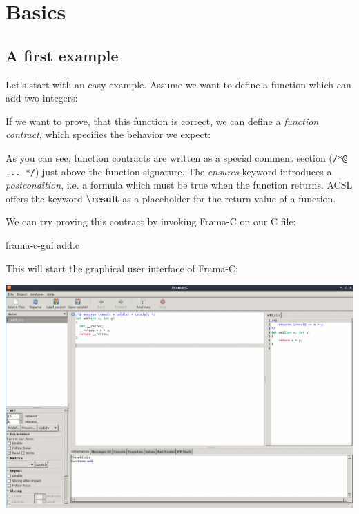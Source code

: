 \chapter{Basics}

\section{A first example}

Let's start with an easy example. Assume we want to define a function which can add two integers:


If we want to prove, that this function is correct, we can define a \emph{function contract}, which specifies the behavior we expect:


As you can see, function contracts are written as a special comment section  (\texttt{/*@ ... */}) just above the function signature. The \emph{ensures} keyword introduces a \emph{postcondition}, i.e. a formula which must be true when the function returns. ACSL offers the keyword \textbf{\textbackslash result} as a placeholder for the return value of a function. 

We can try proving this contract by invoking Frama-C on our C file:

\begin{ubuntu}
frama-c-gui add.c
\end{ubuntu}

This will start the graphical user interface of Frama-C:

\begin{center}
\includegraphics[width=\textwidth]{images/frama_c_add_c1.png}
\end{center}

